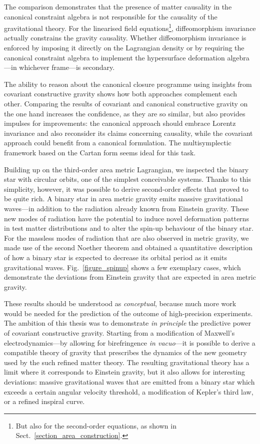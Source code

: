 The comparison demonstrates that the presence of matter causality in the canonical constraint algebra is not responsible for the causality of the gravitational theory. For the linearised field equations\footnote{But also for the second-order equations, as shown in Sect.~\ref{section_area_construction}.}, diffeomorphism invariance actually constrains the gravity causality. Whether diffeomorphism invariance is enforced by imposing it directly on the Lagrangian density or by requiring the canonical constraint algebra to implement the hypersurface deformation algebra---in whichever frame---is secondary.

The ability to reason about the canonical closure programme using insights from covariant constructive gravity shows how both approaches complement each other. Comparing the results of covariant and canonical constructive gravity on the one hand increases the confidence, as they are so similar, but also provides impulses for improvements: the canonical approach should embrace Lorentz invariance and also reconsider its claims concerning causality, while the covariant approach could benefit from a canonical formulation. The multisymplectic framework based on the Cartan form \cite{Gotay_1991} seems ideal for this task.

Building up on the third-order area metric Lagrangian, we inspected the binary star with circular orbits, one of the simplest conceivable systems. Thanks to this simplicity, however, it was possible to derive second-order effects that proved to be quite rich. A binary star in area metric gravity emits massive gravitational waves---in addition to the radiation already known from Einstein gravity. These new modes of radiation have the potential to induce novel deformation patterns in test matter distributions and to alter the spin-up behaviour of the binary star. For the massless modes of radiation that are also observed in metric gravity, we made use of the second Noether theorem and obtained a quantitative description of how a binary star is expected to decrease its orbital period as it emits gravitational waves. Fig.~\ref{figure_spinup} shows a few exemplary cases, which demonstrate the deviations from Einstein gravity that are expected in area metric gravity.

These results should be understood as \emph{conceptual}, because much more work would be needed for the prediction of the outcome of high-precision experiments. The ambition of this thesis was to demonstrate \emph{in principle} the predictive power of covariant constructive gravity. Starting from a modification of Maxwell's electrodynamics---by allowing for birefringence \emph{in vacuo}---it is possible to derive a compatible theory of gravity that prescribes the dynamics of the new geometry used by the such refined matter theory. The resulting gravitational theory has a limit where it corresponds to Einstein gravity, but it also allows for interesting deviations: massive gravitational waves that are emitted from a binary star which exceeds a certain angular velocity threshold, a modification of Kepler's third law, or a refined inspiral curve.

